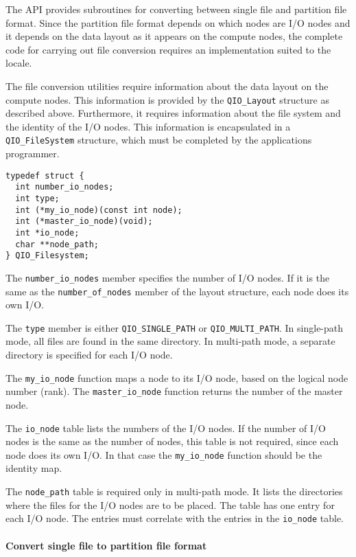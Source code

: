 \documentclass{article}
\begin{document}
The API provides subroutines for converting between single file and
partition file format.  Since the partition file format depends on
which nodes are I/O nodes and it depends on the data layout as it
appears on the compute nodes, the complete code for carrying out file
conversion requires an implementation suited to the locale.

The file conversion utilities require information about the data
layout on the compute nodes.  This information is provided by the
\verb|QIO_Layout| structure as described above.  Furthermore, it
requires information about the file system and the identity of the I/O
nodes.  This information is encapsulated in a \verb|QIO_FileSystem|
structure, which must be completed by the applications programmer.

%
\begin{verbatim}
typedef struct {
  int number_io_nodes;
  int type;                         
  int (*my_io_node)(const int node);
  int (*master_io_node)(void);      
  int *io_node;                     
  char **node_path;
} QIO_Filesystem;
\end{verbatim}
%

The \verb|number_io_nodes| member specifies the number of I/O nodes.
If it is the same as the \verb|number_of_nodes| member of the layout
structure, each node does its own I/O.  

The \verb|type| member is either \verb|QIO_SINGLE_PATH| or
\verb|QIO_MULTI_PATH|.  In single-path mode, all files are found in
the same directory.  In multi-path mode, a separate directory is
specified for each I/O node.

The \verb|my_io_node| function maps a node to its I/O node, based on
the logical node number (rank).  The \verb|master_io_node| function
returns the number of the master node.

The \verb|io_node| table lists the numbers of the I/O nodes.  If the
number of I/O nodes is the same as the number of nodes, this table is
not required, since each node does its own I/O.  In that case the
\verb|my_io_node| function should be the identity map.

The \verb|node_path| table is required only in multi-path mode.  It
lists the directories where the files for the I/O nodes are to be
placed.  The table has one entry for each I/O node.  The entries must
correlate with the entries in the \verb|io_node| table.

\paragraph{Convert single file to partition file format}
\end{document}
